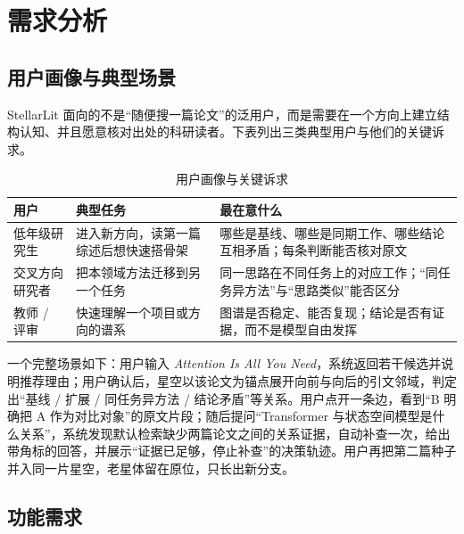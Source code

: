 \section{需求分析}

\subsection{用户画像与典型场景}

StellarLit 面向的不是“随便搜一篇论文”的泛用户，而是需要在一个方向上建立结构认知、并且愿意核对出处的科研读者。下表列出三类典型用户与他们的关键诉求。

\begin{table}[htbp]
  \centering
  \caption{用户画像与关键诉求}
  \label{tab:persona}
  \begin{tabularx}{\textwidth}{L{3.0cm}L{5.5cm}Y}
    \toprule
\textbf{用户} & \textbf{典型任务} & \textbf{最在意什么} \\
    \midrule
    低年级研究生 & 进入新方向，读第一篇综述后想快速搭骨架 & 哪些是基线、哪些是同期工作、哪些结论互相矛盾；每条判断能否核对原文 \\
    交叉方向研究者 & 把本领域方法迁移到另一个任务 & 同一思路在不同任务上的对应工作；“同任务异方法”与“思路类似”能否区分 \\
    教师 / 评审 & 快速理解一个项目或方向的谱系 & 图谱是否稳定、能否复现；结论是否有证据，而不是模型自由发挥 \\
    \bottomrule
  \end{tabularx}
\end{table}

一个完整场景如下：用户输入 \emph{Attention Is All You Need}，系统返回若干候选并说明推荐理由；用户确认后，星空以该论文为锚点展开向前与向后的引文邻域，判定出“基线 / 扩展 / 同任务异方法 / 结论矛盾”等关系。用户点开一条边，看到“B 明确把 A 作为对比对象”的原文片段；随后提问“Transformer 与状态空间模型是什么关系”，系统发现默认检索缺少两篇论文之间的关系证据，自动补查一次，给出带角标的回答，并展示“证据已足够，停止补查”的决策轨迹。用户再把第二篇种子并入同一片星空，老星体留在原位，只长出新分支。

\subsection{功能需求}

